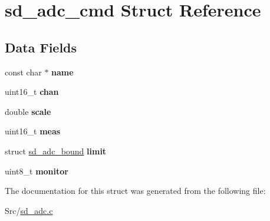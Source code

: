 \hypertarget{structsd__adc__cmd}{}\section{sd\+\_\+adc\+\_\+cmd Struct Reference}
\label{structsd__adc__cmd}
\subsection*{Data Fields}
\begin{DoxyCompactItemize}
\item 
\mbox{\label{structsd__adc__cmd_a8f8f80d37794cde9472343e4487ba3eb}} 
const char $\ast$ {\bfseries name}
\item 
\mbox{\label{structsd__adc__cmd_ab7be689013e9728e79991dfdeb07dd7b}} 
uint16\+\_\+t {\bfseries chan}
\item 
\mbox{\label{structsd__adc__cmd_a80d402d10e8341004c0caf10133b80ab}} 
double {\bfseries scale}
\item 
\mbox{\label{structsd__adc__cmd_a425917b834ea4d87d5aabe513ee5ecaf}} 
uint16\+\_\+t {\bfseries meas}
\item 
\mbox{\label{structsd__adc__cmd_a3a2144a6b3ab7623f791db591af631b2}} 
struct \mbox{\hyperlink{structsd__adc__bound}{sd\+\_\+adc\+\_\+bound}} {\bfseries limit}
\item 
\mbox{\label{structsd__adc__cmd_a700fd35ce45b94f22bd3e6608458e2e0}} 
uint8\+\_\+t {\bfseries monitor}
\end{DoxyCompactItemize}


The documentation for this struct was generated from the following file\+:\begin{DoxyCompactItemize}
\item 
Src/\mbox{\hyperlink{sd__adc_8c}{sd\+\_\+adc.\+c}}\end{DoxyCompactItemize}
